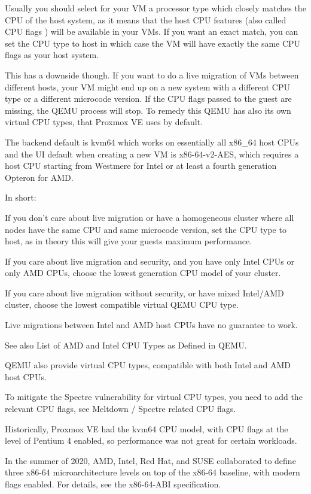 Usually you should select for your VM a processor type which closely matches the CPU of the host system, as it means that the host CPU features (also called CPU flags ) will be available in your VMs. If you want an exact match, you can set the CPU type to host in which case the VM will have exactly the same CPU flags as your host system.

This has a downside though. If you want to do a live migration of VMs between different hosts, your VM might end up on a new system with a different CPU type or a different microcode version. If the CPU flags passed to the guest are missing, the QEMU process will stop. To remedy this QEMU has also its own virtual CPU types, that Proxmox VE uses by default.

The backend default is kvm64 which works on essentially all x86_64 host CPUs and the UI default when creating a new VM is x86-64-v2-AES, which requires a host CPU starting from Westmere for Intel or at least a fourth generation Opteron for AMD.

In short:

If you don’t care about live migration or have a homogeneous cluster where all nodes have the same CPU and same microcode version, set the CPU type to host, as in theory this will give your guests maximum performance.

If you care about live migration and security, and you have only Intel CPUs or only AMD CPUs, choose the lowest generation CPU model of your cluster.

If you care about live migration without security, or have mixed Intel/AMD cluster, choose the lowest compatible virtual QEMU CPU type.

Live migrations between Intel and AMD host CPUs have no guarantee to work.

See also List of AMD and Intel CPU Types as Defined in QEMU.

QEMU also provide virtual CPU types, compatible with both Intel and AMD host CPUs.

To mitigate the Spectre vulnerability for virtual CPU types, you need to add the relevant CPU flags, see Meltdown / Spectre related CPU flags.

Historically, Proxmox VE had the kvm64 CPU model, with CPU flags at the level of Pentium 4 enabled, so performance was not great for certain workloads.

In the summer of 2020, AMD, Intel, Red Hat, and SUSE collaborated to define three x86-64 microarchitecture levels on top of the x86-64 baseline, with modern flags enabled. For details, see the x86-64-ABI specification.

